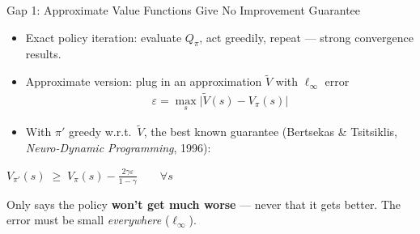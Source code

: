 \documentclass[aspectratio=169]{beamer}
\begin{document}
\begin{frame}{Gap 1: Approximate Value Functions Give No Improvement Guarantee}
  \begin{itemize}
    \item Exact policy iteration: evaluate $Q_\pi$, act greedily, repeat --- strong convergence results.
    \item Approximate version: plug in an approximation $\tilde V$ with $\ell_\infty$ error
      \begin{gather*}
        \varepsilon = \max_s \big|\tilde V(s) - V_\pi(s)\big|
      \end{gather*}
    \item With $\pi'$ greedy w.r.t.\ $\tilde V$, the best known guarantee (Bertsekas \& Tsitsiklis, \emph{Neuro-Dynamic Programming}, 1996):
  \end{itemize}
  \begin{formulabox}
    $\displaystyle V_{\pi'}(s) \;\ge\; V_\pi(s) - \frac{2\gamma\varepsilon}{1-\gamma} \qquad \forall s$
  \end{formulabox}
  \begin{badbox}
    \small Only says the policy \textbf{won't get much worse} --- never that it gets better. The error must be small \emph{everywhere} ($\ell_\infty$).
  \end{badbox}
\end{frame}
\end{document}
